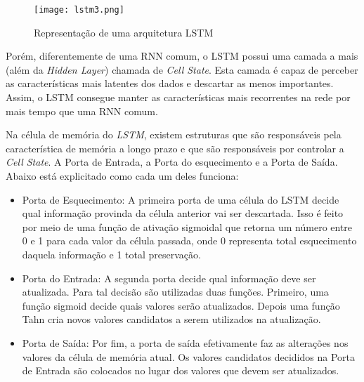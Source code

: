 \begin{figure}[htbp]
    \centering
    \texttt{[image: lstm3.png]}
    \label{figure:eixo}
    \caption[Representação de uma arquitetura LSTM]{Representação de uma arquitetura LSTM\footnotemark}
\end{figure}


Porém, diferentemente de uma \acrshort{RNN} comum, o LSTM possui uma camada a mais (além da \textit{Hidden Layer}) chamada de \textit{Cell State}. Esta camada é capaz de perceber as características mais latentes dos dados e descartar as menos importantes. Assim, o \acrshort{LSTM} consegue manter as características mais recorrentes na rede por mais tempo que uma \acrshort{RNN} comum. 

Na célula de memória do \textit{\acrshort{LSTM}}, existem estruturas que são responsáveis pela característica de memória a longo prazo e que são responsáveis por controlar a \textit{Cell State}. A Porta de Entrada, a Porta do esquecimento e a Porta de Saída. Abaixo está explicitado como cada um deles funciona:
\begin{itemize}
  \item Porta de Esquecimento: A primeira porta de uma célula do \acrfull{LSTM} decide qual informação provinda da célula anterior vai ser descartada. Isso é feito por meio de uma função de ativação sigmoidal que retorna um número entre 0 e 1 para cada valor da célula passada, onde 0 representa total esquecimento daquela informação e 1 total preservação.
  
  \item Porta do Entrada: A segunda porta decide qual informação deve ser atualizada. Para tal decisão são utilizadas duas funções. Primeiro, uma função sigmoid decide quais valores serão atualizados. Depois uma função Tahn cria novos valores candidatos a serem utilizados na atualização.
  \item Porta de Saída: Por fim, a porta de saída efetivamente faz as alterações nos valores da célula de memória atual. Os valores candidatos decididos na Porta de Entrada são colocados no lugar dos valores que devem ser atualizados.
\end{itemize}


